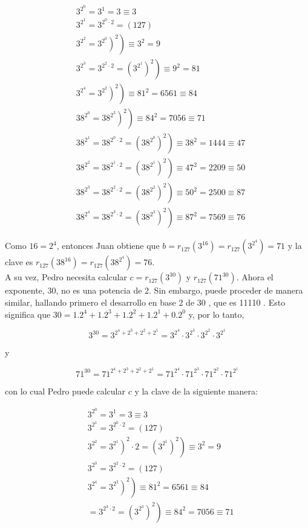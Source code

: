 \documentclass[10pt]{article}
\begin{document}
\begin{align*}
& 3^{2^{0}}=3^{1}=3 \equiv 3 \\
& 3^{2^{1}}=3^{2^{0} \cdot 2}=(127)  \tag{127}\\
& \left.\left.3^{2^{2}}=3^{2^{0}}\right)^{2}\right) \equiv 3^{2}=9  \tag{127}\\
& \left.3^{2^{3}}=3^{2^{2} \cdot 2}=\left(3^{2^{1}}\right)^{2}\right) \equiv 9^{2}=81  \tag{127}\\
& \left.\left.3^{2^{4}}=3^{2^{2}}\right)^{2}\right) \equiv 81^{2}=6561 \equiv 84  \tag{127}\\
& \left.\left.38^{2^{0}}=38^{2^{3}}\right)^{2}\right) \equiv 84^{2}=7056 \equiv 71  \tag{127}\\
& \left.38^{2^{1}}=38^{2^{0} \cdot 2}=\left(38^{2^{0}}\right)^{2}\right) \equiv 38^{2}=1444 \equiv 47  \tag{127}\\
& \left.38^{2^{2}}=38^{2^{1} \cdot 2}=\left(38^{2^{1}}\right)^{2}\right) \equiv 47^{2}=2209 \equiv 50  \tag{127}\\
& \left.38^{2^{3}}=38^{2^{2} \cdot 2}=\left(38^{2^{2}}\right)^{2}\right) \equiv 50^{2}=2500 \equiv 87  \tag{127}\\
& \left.38^{2^{4}}=38^{2^{3} \cdot 2}=\left(38^{2^{3}}\right)^{2}\right) \equiv 87^{2}=7569 \equiv 76 \tag{127}
\end{align*}


Como $16=2^{4}$, entonces Juan obtiene que $b=r_{127}\left(3^{16}\right)=r_{127}\left(3^{2^{4}}\right)=71$ y la clave es $r_{127}\left(38^{16}\right)=r_{127}\left(38^{2^{4}}\right)=76$.\\
A su vez, Pedro necesita calcular $c=r_{127}\left(3^{30}\right)$ y $r_{127}\left(71^{30}\right)$. Ahora el exponente, 30, no es una potencia de 2. Sin embargo, puede proceder de manera similar, hallando primero el desarrollo en base 2 de 30 , que es 11110 . Esto significa que $30=1.2^{4}+1.2^{3}+1.2^{2}+1.2^{1}+0.2^{0}$ y, por lo tanto,

$$
3^{30}=3^{2^{4}+2^{3}+2^{2}+2^{1}}=3^{2^{4}} \cdot 3^{2^{3}} \cdot 3^{2^{2}} \cdot 3^{2^{1}}
$$

y

$$
71^{30}=71^{2^{4}+2^{3}+2^{2}+2^{1}}=71^{2^{4}} \cdot 71^{2^{3}} \cdot 71^{2^{2}} \cdot 71^{2^{1}}
$$

con lo cual Pedro puede calcular $c$ y la clave de la siguiente manera:


\begin{align*}
& 3^{2^{0}}=3^{1}=3 \equiv 3  \tag{127}\\
& 3^{2^{1}}=3^{2^{0} \cdot 2}=(127)  \tag{127}\\
& \left.\left.3^{2^{2}}=3^{2^{1}}\right)^{2} \cdot 2=\left(3^{2^{1}}\right)^{2}\right) \equiv 3^{2}=9  \tag{127}\\
& 3^{2^{3}}=3^{2^{2} \cdot 2}=(127)  \tag{127}\\
& \left.\left.3^{2^{4}}=3^{2^{2}}\right)^{2}\right) \equiv 81^{2}=6561 \equiv 84  \tag{127}\\
& \left.=3^{2^{3} \cdot 2}=\left(3^{2^{3}}\right)^{2}\right) \equiv 84^{2}=7056 \equiv 71
\end{align*}
\end{document}
